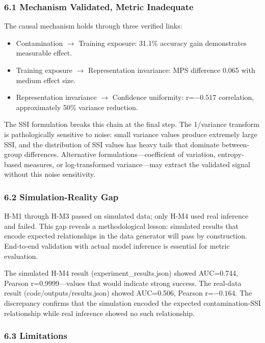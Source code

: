 
\subsubsection{6.1 Mechanism Validated, Metric Inadequate}

The causal mechanism holds through three verified links:

\begin{itemize}
\item Contamination $\rightarrow$ Training exposure: 31.1\% accuracy gain demonstrates measurable effect.
\item Training exposure $\rightarrow$ Representation invariance: MPS difference 0.065 with medium effect size.
\item Representation invariance $\rightarrow$ Confidence uniformity: r=$-0.517$ correlation, approximately 50\% variance reduction.
\end{itemize}

The SSI formulation breaks this chain at the final step. The 1/variance transform is pathologically sensitive to noise: small variance values produce extremely large SSI, and the distribution of SSI values has heavy tails that dominate between-group differences. Alternative formulations---coefficient of variation, entropy-based measures, or log-transformed variance---may extract the validated signal without this noise sensitivity.

\subsubsection{6.2 Simulation-Reality Gap}

H-M1 through H-M3 passed on simulated data; only H-M4 used real inference and failed. This gap reveals a methodological lesson: simulated results that encode expected relationships in the data generator will pass by construction. End-to-end validation with actual model inference is essential for metric evaluation.

The simulated H-M4 result (experiment\_results.json) showed AUC=0.744, Pearson r=0.9999---values that would indicate strong success. The real-data result (code/outputs/results.json) showed AUC=0.506, Pearson r=$-0.164$. The discrepancy confirms that the simulation encoded the expected contamination-SSI relationship while real inference showed no such relationship.

\subsubsection{6.3 Limitations}

